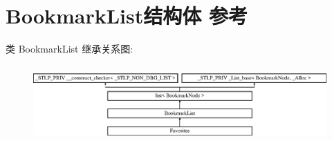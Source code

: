 \hypertarget{struct_bookmark_list}{}\section{Bookmark\+List结构体 参考}
\label{struct_bookmark_list}
类 Bookmark\+List 继承关系图\+:\begin{figure}[H]
\begin{center}
\leavevmode
\includegraphics[height=2.970822cm]{struct_bookmark_list}
\end{center}
\end{figure}
